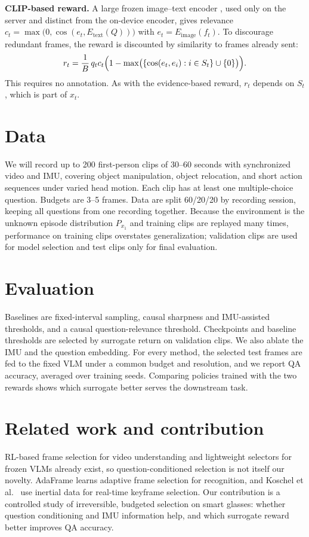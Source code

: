 \documentclass[
  11pt,
]{article}
\begin{document}
\textbf{CLIP-based reward.} A large frozen image--text encoder
\cite{clip}, used only on the server and distinct from the on-device
encoder, gives relevance
$c_t=\max\bigl(0,\cos(e_t,E_{\mathrm{text}}(Q))\bigr)$ with
$e_t=E_{\mathrm{image}}(f_t)$. To discourage redundant frames, the
reward is discounted by similarity to frames already sent:
\[
r_t=\frac{1}{B}\,q_t c_t\Bigl(1-\max\bigl(\{\cos(e_t,e_i):i\in S_t\}\cup\{0\}\bigr)\Bigr).
\]
This requires no annotation. As with the evidence-based reward, $r_t$
depends on $S_t$, which is part of $x_t$.

\section{Data}

We will record up to 200 first-person clips of 30--60 seconds with
synchronized video and IMU, covering object manipulation, object
relocation, and short action sequences under varied head motion. Each
clip has at least one multiple-choice question. Budgets are 3--5
frames. Data are split 60/20/20 by recording session, keeping all
questions from one recording together. Because the environment is the
unknown episode distribution $P_{x_1}$ and training clips are replayed
many times, performance on training clips overstates generalization;
validation clips are used for model selection and test clips only for
final evaluation.

\section{Evaluation}

Baselines are fixed-interval sampling, causal sharpness and
IMU-assisted thresholds, and a causal question-relevance threshold.
Checkpoints and baseline thresholds are selected by surrogate return on
validation clips. We also ablate the IMU and the question embedding.
For every method, the selected test frames are fed to the fixed VLM
under a common budget and resolution, and we report QA accuracy,
averaged over training seeds. Comparing policies trained with the two
rewards shows which surrogate better serves the downstream task.

\section{Related work and contribution}

RL-based frame selection for video understanding \cite{qin} and
lightweight selectors for frozen VLMs \cite{hornet} already exist, so
question-conditioned selection is not itself our novelty. AdaFrame
\cite{adaframe} learns adaptive frame selection for recognition, and
Koschel et al.\ \cite{koschel} use inertial data for real-time keyframe
selection. Our contribution is a controlled study of irreversible,
budgeted selection on smart glasses: whether question conditioning and
IMU information help, and which surrogate reward better improves QA
accuracy.
\end{document}

